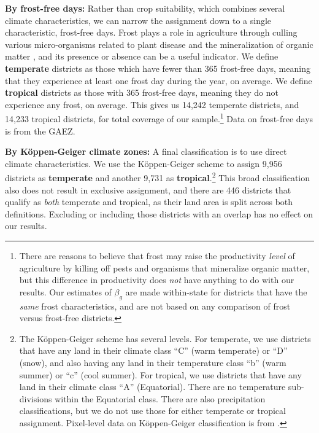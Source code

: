\documentclass[11pt]{article}
\begin{document}
\vspace{.5cm}\noindent\textbf{By frost-free days:} Rather than crop suitability, which combines several climate characteristics, we can narrow the assignment down to a single characteristic, frost-free days. Frost plays a role in agriculture through culling various micro-organisms related to plant disease and the mineralization of organic matter \citep{Masters:2001kl}, and its presence or absence can be a useful indicator. We define \textbf{temperate} districts as those which have fewer than 365 frost-free days, meaning that they experience at least one frost day during the year, on average. We define \textbf{tropical} districts as those with 365 frost-free days, meaning they do not experience any frost, on average. This gives us 14,242 temperate districts, and 14,233 tropical districts, for total coverage of our sample.\footnote{There are reasons to believe that frost may raise the productivity \textit{level} of agriculture by killing off pests and organisms that mineralize organic matter, but this difference in productivity does \textit{not} have anything to do with our results. Our estimates of $\beta_g$ are made within-state for districts that have the \textit{same} frost characteristics, and are not based on any comparison of frost versus frost-free districts.} Data on frost-free days is from the GAEZ.

\vspace{.5cm}\noindent\textbf{By K{\"o}ppen-Geiger climate zones:} A final classification is to use direct climate characteristics. We use the K{\"o}ppen-Geiger scheme to assign 9,956 districts as \textbf{temperate} and another 9,731 as \textbf{tropical}.\footnote{The K{\"o}ppen-Geiger scheme has several levels. For temperate, we use districts that have any land in their climate class ``C'' (warm temperate) or ``D'' (snow), and also having any land in their temperature class ``b'' (warm summer) or ``c'' (cool summer). For tropical, we use districts that have any land in their climate class ``A'' (Equatorial). There are no temperature sub-divisions within the Equatorial class. There are also precipitation classifications, but we do not use those for either temperate or tropical assignment. Pixel-level data on K{\"o}ppen-Geiger classification is from \cite{kottek2006}.} This broad classification also does not result in exclusive assignment, and there are 446 districts that qualify as \textit{both} temperate and tropical, as their land area is split across both definitions. Excluding or including those districts with an overlap has no effect on our results.
\end{document}
